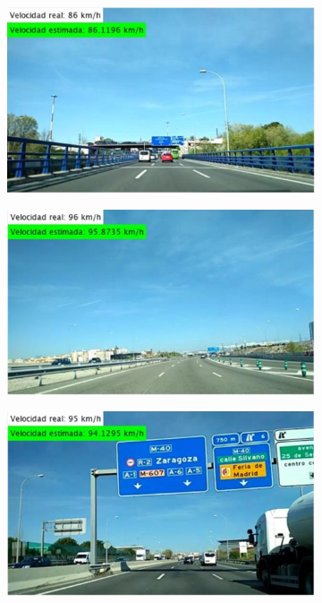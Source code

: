 \vfill
\begin{figure}[H]
\centering
  \begin{subfigure}[b]{0.475\linewidth}
    \includegraphics[width=\linewidth]{Figuras/Resultado_SVR_Autovia_BIEN_1.eps}
  \end{subfigure}
  \begin{subfigure}[b]{0.475\linewidth}
    \includegraphics[width=\linewidth]{Figuras/Resultado_SVR_Autovia_BIEN_2.eps}
  \end{subfigure}
  \begin{subfigure}[b]{0.475\linewidth}
    \includegraphics[width=\linewidth]{Figuras/Resultado_SVR_Autovia_BIEN_3.eps}

\end{subfigure}
\end{figure}
